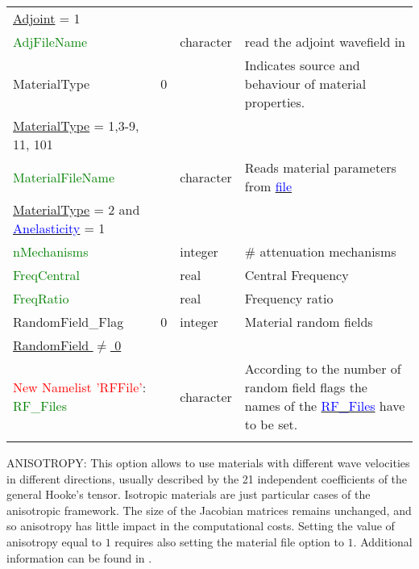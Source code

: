 \documentclass[12pt,twoside]{article}
\begin{document}
\begin{longtable}{|p{3cm}|p{2.4cm}|p{2cm}|p{5cm}|}
\hdashline
\uline{Adjoint} = 1 & & &\\
\textcolor{green}{AdjFileName} & & character & read the adjoint wavefield in\\
\hline
MaterialType & 0 & & Indicates source and behaviour of material properties.\\
\hdashline
\uline{MaterialType} = 1,3-9, 11, 101 & & &\\
\textcolor{green}{MaterialFileName} & & character & Reads material parameters from \hyperlink{material}{\textcolor{blue}{file}}\\
\hdashline
\uline{MaterialType} = 2 and \uline{\hyperlink{anelas}{\textcolor{blue}{Anelasticity}}} = 1 & & &\\
\textcolor{green}{nMechanisms} & & integer & \# attenuation mechanisms\\
\textcolor{green}{FreqCentral} & & real & Central Frequency \\
\textcolor{green}{FreqRatio} & & real & Frequency ratio \\
\hline
RandomField\_Flag & 0 & integer & Material random fields\\
\hdashline
\uline{RandomField $\neq$ 0} & & &\\
\textcolor{red}{New Namelist 'RFFile'}: \textcolor{green}{RF\_Files} & & character & According to the number of random field flags the names of the
\hyperlink{random_field}{\textcolor{blue}{RF\_Files}} have to be set.\\
\hline
\label{eq-table}
\end{longtable}

\noindent
\hypertarget{aniso}{ANISOTROPY}: This option allows to use materials with different wave velocities in different directions, 
usually described by the 21 independent coefficients of the general Hooke's tensor.
Isotropic materials are just particular cases of the anisotropic framework. 
The size of the Jacobian matrices remains unchanged, and so anisotropy has little impact in the computational costs.
Setting the value of anisotropy equal to $1$ requires also setting the material file option to $1$.
Additional information can be found in \cite{PuenteKaeserDumbserIgel07}.\\
\end{document}
